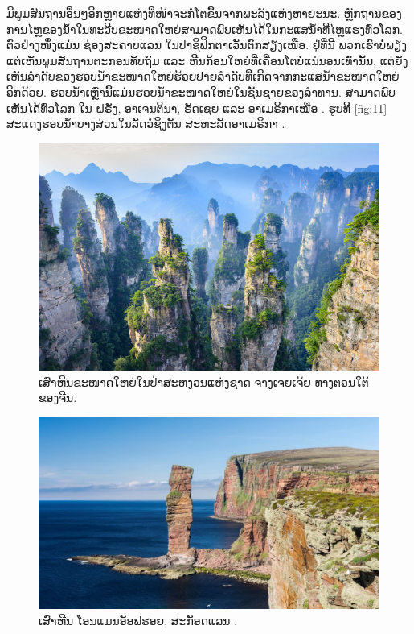 \documentclass[10pt,twocolumn,letterpaper]{article}
\begin{document}
ມີພູມສັນຖານອື່ນໆອີກຫຼາຍແຫ່ງທີ່ໜ້າຈະກໍ່ໂຕຂຶ້ນຈາກພະລັງແຫ່ງຫາຍະນະ. ຫຼັກຖານຂອງການໄຫຼຂອງນ້ຳໃນທະວີບຂະໜາດໃຫຍ່ສາມາດພົບເຫັນໄດ້ໃນກະແສນ້ຳທີ່ໄຫຼແຮງທົ່ວໂລກ. ຕົວຢ່າງໜຶ່ງແມ່ນ ຊ່ອງສະຄາບແລນ ໃນປາຊິຟິກຕາເວັນຕົກສຽງເໜືອ. ຢູ່ທີ່ນີ້ ພວກເຮົາບໍ່ພຽງແຕ່ເຫັນພູມສັນຖານຕະກອນທັບຖົມ ແລະ ຫີນກ້ອນໃຫຍ່ທີ່ເຄື່ອນໂຕບໍ່ແນ່ນອນເທົ່ານັ້ນ, ແຕ່ຍັງເຫັນລຳດັບຂອງຮອບນ້ຳຂະໜາດໃຫຍ່ຮ້ອຍປາຍລຳດັບທີ່ເກີດຈາກກະແສນ້ຳຂະໜາດໃຫຍ່ \cite{78,79} ອີກດ້ວຍ. ຮອບນ້ຳເຫຼົ່ານີ້ແມ່ນຮອບນ້ຳຂະໜາດໃຫຍ່ໃນຊັ້ນຊາຍຂອງລຳທານ. ສາມາດພົບເຫັນໄດ້ທົ່ວໂລກ ໃນ ຝຣັ່ງ, ອາເຈນຕິນາ, ຣັດເຊຍ ແລະ ອາເມຣິກາເໜືອ \cite{81}. ຮູບທີ \ref{fig:11} ສະແດງຮອບນ້ຳບາງສ່ວນໃນລັດວໍຊິງຕັນ ສະຫະລັດອາເມຣິກາ \cite{80}.

\begin{figure}[t]
\begin{center}
   \includegraphics[width=1\linewidth]{zhangjiajie.jpg}
\end{center}
   \caption{ເສົາຫີນຂະໜາດໃຫຍ່ໃນປ່າສະຫງວນແຫ່ງຊາດ ຈາງເຈຍເຈ້ຍ ທາງຕອນໃຕ້ຂອງຈີນ.}
\label{fig:12}
\label{fig:onecol}
\end{figure}

\begin{figure}[t]
\begin{center}
   \includegraphics[width=1\linewidth]{hoy.jpg}
\end{center}
   \caption{ເສົາຫີນ ໂອນແມນອັອຟຮອຍ, ສະກັອດແລນ \cite{83}.}
\label{fig:13}
\label{fig:onecol}
\end{figure}
\end{document}

